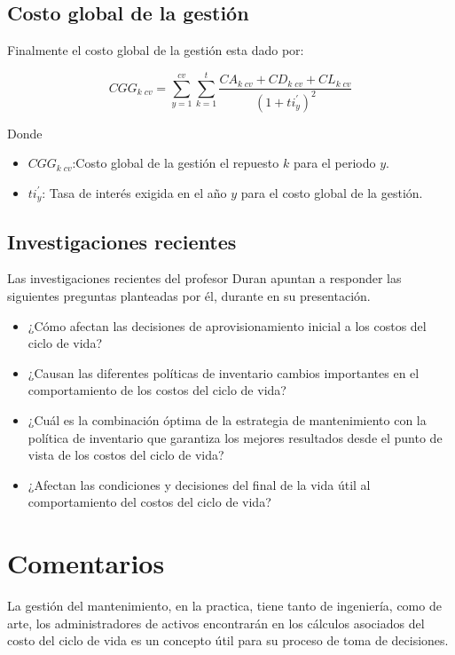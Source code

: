 \documentclass{article}
\begin{document}
\subsection{Costo global de la gestión}

Finalmente el costo global de la gestión esta dado por:

\begin{equation}
  CGG_{k\;cv}=\sum_{y=1}^{cv} \sum_{k=1}^{t} \frac{ CA_{k\;cv}+ CD_{k\;cv}+ CL_{k\;cv}}{(1+ti_{y}^{'})^{2}}
  \end{equation}

Donde

\begin{itemize}
    \item $CGG_{k\;cv}$:Costo global de la gestión el repuesto $k$ para el periodo $y$.
    \item $ti_{y}^{'}$: Tasa de interés exigida en el año $y$ para el costo global de la gestión.
\end{itemize}

\subsection{Investigaciones recientes}

Las investigaciones recientes del profesor Duran apuntan a responder las siguientes preguntas planteadas por él, durante en su presentación.

\begin{itemize}
    \item ¿Cómo afectan las decisiones de aprovisionamiento inicial a los costos del ciclo de vida?
    \item ¿Causan las diferentes políticas de inventario cambios importantes en el comportamiento de los costos del ciclo de vida?
    \item¿Cuál es la combinación óptima de la estrategia de mantenimiento con la política de inventario que garantiza los mejores resultados desde el punto de vista de los costos del ciclo de vida?
  \item¿Afectan las condiciones y decisiones del final de la vida útil al comportamiento del costos del ciclo de vida?
\end{itemize}

\section{Comentarios}

La gestión del mantenimiento, en la practica, tiene tanto de ingeniería, como de arte, los administradores de activos encontrarán en los cálculos asociados del costo del ciclo de vida es un concepto útil para su proceso de toma de decisiones. 
\end{document}

